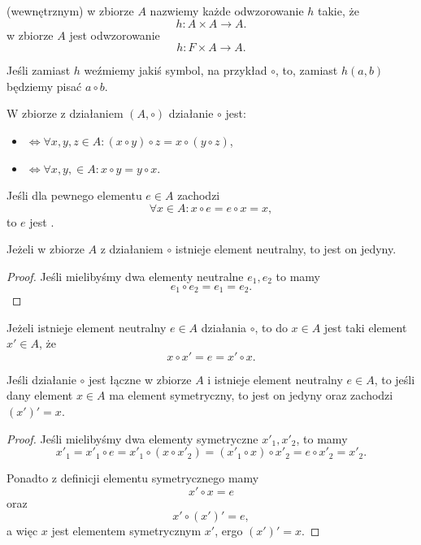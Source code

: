  (wewnętrznym) w zbiorze $A$ nazwiemy każde odwzorowanie $h$ takie, że
\[ h : A \times A \to A. \]
 w zbiorze $A$ jest odwzorowanie
\[ h : F \times A \to A. \]

Jeśli zamiast $h$ weźmiemy jakiś symbol, na przykład $\circ$, to, zamiast $h(a, b)$ będziemy pisać $a \circ b$.

\begin{definition}
    W zbiorze z działaniem $(A, \circ)$ działanie $\circ$ jest:
    \begin{itemize}
        \item {} $\iff \forall x, y, z \in A : (x \circ y) \circ z = x \circ (y \circ z)$,
        \item {} $\iff \forall x, y, \in A : x \circ y = y \circ x$.
    \end{itemize}
\end{definition}

Jeśli dla pewnego elementu $e \in A$ zachodzi
\[ \forall x \in A : x \circ e = e \circ x = x, \]
to $e$ jest .

\begin{fact}
    Jeżeli w zbiorze $A$ z działaniem $\circ$ istnieje element neutralny, to jest on jedyny.
\end{fact}
\begin{proof}
    Jeśli mielibyśmy dwa elementy neutralne $e_1, e_2$ to mamy
    \[ e_1 \circ e_2 = e_1 = e_2. \]
\end{proof}

Jeżeli istnieje element neutralny $e \in A$ działania $\circ$, to  do $x \in A$ jest taki element $x' \in A$, że
\[ x \circ x' = e = x' \circ x. \]

\begin{lemma}
    Jeśli działanie $\circ$ jest łączne w zbiorze $A$ i istnieje element neutralny $e \in A$, to jeśli dany element $x \in A$ ma element symetryczny, to jest on jedyny oraz zachodzi $(x')' = x$.
\end{lemma}
\begin{proof}
    Jeśli mielibyśmy dwa elementy symetryczne $x'_1, x'_2$, to mamy
    \[ x'_1 = x'_1 \circ e = x'_1 \circ (x \circ x'_2) = (x'_1 \circ x) \circ x'_2 = e \circ x'_2 = x'_2. \]

    Ponadto z definicji elementu symetrycznego mamy
    \[ x' \circ x = e \]
    oraz
    \[ x' \circ (x')' = e, \]
    a więc $x$ jest elementem symetrycznym $x'$, ergo $(x')' = x$.
\end{proof}

